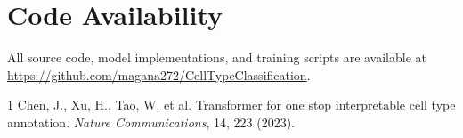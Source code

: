 \documentclass[11pt,letterpaper]{article}
\begin{document}
\section*{Code Availability}
All source code, model implementations, and training scripts are available at
\url{https://github.com/magana272/CellTypeClassification}.


\begin{thebibliography}{1}
Chen, J., Xu, H., Tao, W. et al.
\newblock Transformer for one stop interpretable cell type annotation.
\newblock \emph{Nature Communications}, 14, 223 (2023).
\end{thebibliography}
\end{document}
